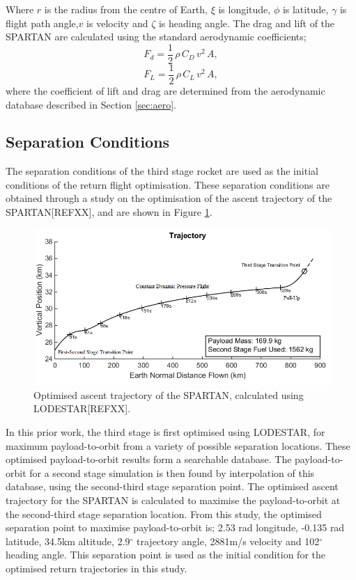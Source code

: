 \documentclass[conf]{new-aiaa}
\begin{document}
Where $r$ is the radius from the centre of Earth, $\xi$ is longitude, $\phi$ is latitude, $\gamma$ is flight path angle,$v$ is velocity and $\zeta$ is heading angle. The drag and lift of the SPARTAN are calculated using the standard aerodynamic coefficients;
\begin{equation}
F_d = \frac{1}{2} \, \rho \, C_D \, v^2 \, A ,
\end{equation}
\begin{equation}
F_L = \frac{1}{2} \, \rho \, C_L \, v^2 \, A ,
\end{equation}
where the coefficient of lift and drag are determined from the aerodynamic database described in Section \ref{sec:aero}.

\subsection{Separation Conditions}
The separation conditions of the third stage rocket are used as the initial conditions of the return flight optimisation. These separation conditions are obtained through a study on the optimisation of the ascent trajectory of the SPARTAN[REFXX], and are shown in Figure \ref*{fig:qlimited50kpa}.
\begin{figure}[ht]
	\centering
	\includegraphics[width=0.6\linewidth]{Figures/qlimited50kpa}
	\caption{Optimised ascent trajectory of the SPARTAN, calculated using LODESTAR[REFXX].}
	\label{fig:qlimited50kpa}
\end{figure}
 In this prior work, the third stage is first optimised using LODESTAR, for maximum payload-to-orbit from a variety of possible separation locations. These optimised payload-to-orbit results form a searchable database. The payload-to-orbit for a second stage simulation is then found by interpolation of this database, using the second-third stage separation point. The optimised ascent trajectory for the SPARTAN is calculated to maximise the payload-to-orbit at the second-third stage separation location. From this study, the optimised separation point to maximise payload-to-orbit is; 2.53 rad longitude, -0.135 rad latitude, 34.5km altitude, 2.9$^\circ$ trajectory angle, 2881m/s velocity and 102$^\circ$ heading angle. This separation point is used as the initial condition for the optimised return trajectories in this study.  
\end{document}
